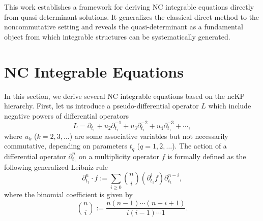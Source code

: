 \documentclass[11p,reqno]{amsart}
\numberwithin{equation}{section}
\numberwithin{equation}{section}
\begin{document}
This work establishes a framework for deriving NC integrable equations directly from quasi-determinant solutions. It generalizes the classical direct method to the noncommutative setting and reveals the quasi-determinant as a fundamental object from which integrable structures can be systematically generated.

\section{NC Integrable Equations}
\noindent In this section, we derive several NC integrable equations based on the ncKP hierarchy. First, let us introduce a pseudo-differential operator $L$ which include negative powers of differential operators
\begin{equation}
    L = \partial_{t_1} + u_2 \partial_{t_1}^{-1} + u_3 \partial_{t_1}^{-2} + u_4 \partial_{t_1}^{-3} + \cdots,
\end{equation}
where $u_k$ ($k = 2,3, \ldots$) are some associative variables but not necessarily commutative, depending on parameters $t_q$ ($q = 1, 2, \ldots$). The action of a differential operator $\partial_{t_1}^n$ on a multiplicity operator $f$ is formally defined as the following generalized Leibniz rule
\begin{equation}
    \partial_{t_1}^n \cdot f := \sum_{i \geq 0} \binom{n}{i} (\partial_{t_1}^i f) \partial_{t_1}^{n-i},
\end{equation}
where the binomial coefficient is given by
\begin{equation}
    \binom{n}{i} := \frac{n (n-1) \cdots (n-i+1)}{i (i-1) \cdots 1}.
\end{equation}
\end{document}
